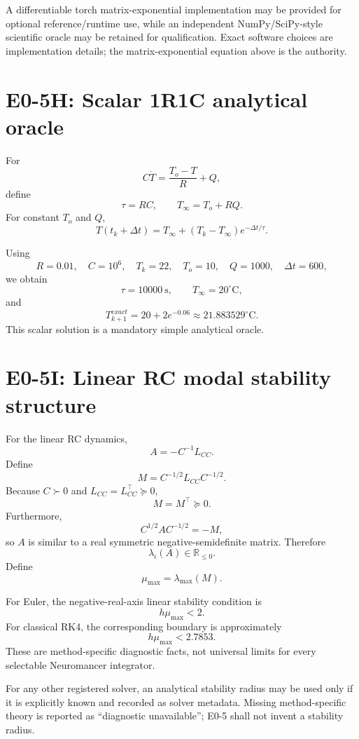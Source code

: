 \documentclass[11pt]{article}
\newcommand{\R}{\mathbb{R}}
\begin{document}
A differentiable torch matrix-exponential implementation may be provided for
optional reference/runtime use, while an independent NumPy/SciPy-style
scientific oracle may be retained for qualification. Exact software choices are
implementation details; the matrix-exponential equation above is the authority.

\section{E0-5H: Scalar 1R1C analytical oracle}

For
\[
C\dot T=\frac{T_o-T}{R}+Q,
\]
define
\[
\tau=RC,
\qquad
\boxed{T_\infty=T_o+RQ.}
\]
For constant $T_o$ and $Q$,
\[
\boxed{
T(t_k+\Delta t)
=T_\infty+(T_k-T_\infty)e^{-\Delta t/\tau}.
}
\]

Using
\[
R=0.01,\quad C=10^6,\quad T_k=22,\quad T_o=10,\quad Q=1000,
\quad \Delta t=600,
\]
we obtain
\[
\tau=10000\ \mathrm s,
\qquad T_\infty=20^\circ\mathrm C,
\]
and
\[
\boxed{
T_{k+1}^{exact}=20+2e^{-0.06}\approx21.883529^\circ\mathrm C.
}
\]
This scalar solution is a mandatory simple analytical oracle.

\section{E0-5I: Linear RC modal stability structure}

For the linear RC dynamics,
\[
A=-C^{-1}L_{CC}.
\]
Define
\[
M=C^{-1/2}L_{CC}C^{-1/2}.
\]
Because $C\succ0$ and $L_{CC}=L_{CC}^\top\succeq0$,
\[
M=M^\top\succeq0.
\]
Furthermore,
\[
C^{1/2}AC^{-1/2}=-M,
\]
so $A$ is similar to a real symmetric negative-semidefinite matrix. Therefore
\[
\boxed{\lambda_i(A)\in\R_{\le0}.}
\]
Define
\[
\boxed{\mu_{\max}=\lambda_{\max}(M).}
\]

For Euler, the negative-real-axis linear stability condition is
\[
\boxed{h\mu_{\max}<2.}
\]
For classical RK4, the corresponding boundary is approximately
\[
\boxed{h\mu_{\max}<2.7853.}
\]
These are method-specific diagnostic facts, not universal limits for every
selectable Neuromancer integrator.

For any other registered solver, an analytical stability radius may be used
only if it is explicitly known and recorded as solver metadata. Missing
method-specific theory is reported as ``diagnostic unavailable''; E0-5 shall not
invent a stability radius.
\end{document}
